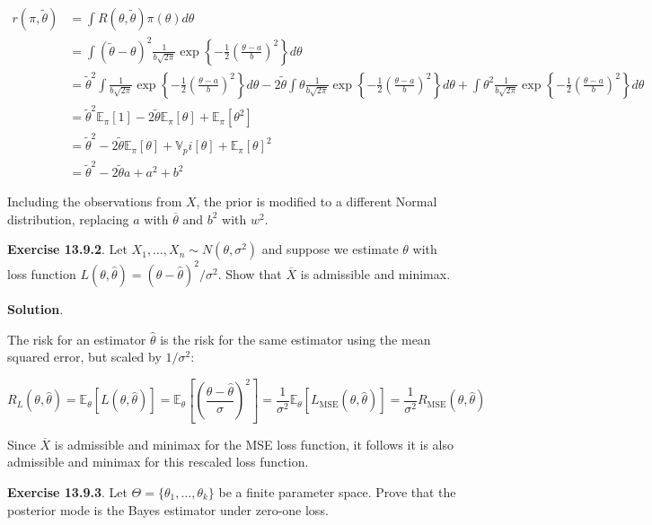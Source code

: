\begin{align}
r(\pi, \tilde{\theta}) &= \int R(\theta, \tilde{\theta}) \pi(\theta) d\theta \\
&= \int (\tilde{\theta} - \theta)^2 \frac{1}{b \sqrt{2 \pi}} \exp \left\{ -\frac{1}{2} \left(\frac{\theta - a}{b}\right)^2 \right\} d\theta \\
&= \tilde{\theta}^2 \int \frac{1}{b \sqrt{2 \pi}} \exp \left\{ -\frac{1}{2} \left(\frac{\theta - a}{b}\right)^2 \right\} d\theta
- 2 \tilde{\theta} \int \theta \frac{1}{b \sqrt{2 \pi}} \exp \left\{ -\frac{1}{2} \left(\frac{\theta - a}{b}\right)^2 \right\} d\theta
+ \int \theta^2 \frac{1}{b \sqrt{2 \pi}} \exp \left\{ -\frac{1}{2} \left(\frac{\theta - a}{b}\right)^2 \right\} d\theta \\
&= \tilde{\theta}^2 \mathbb{E}_\pi[1] - 2 \tilde{\theta} \mathbb{E}_\pi[\theta] + \mathbb{E}_\pi[\theta^2] \\
&= \tilde{\theta}^2 - 2 \tilde{\theta} \mathbb{E}_\pi[\theta] + \mathbb{V}_pi[\theta] + \mathbb{E}_\pi[\theta]^2 \\
&= \tilde{\theta}^2 - 2 \tilde{\theta} a + a^2 + b^2
\end{align}

Including the observations from \(X\), the prior is modified to a
different Normal distribution, replacing \(a\) with
\(\overline{\theta}\) and \(b^2\) with \(w^2\).

\textbf{Exercise 13.9.2}. Let
\(X_1, \dots, X_n \sim N(\theta, \sigma^2)\) and suppose we estimate
\(\theta\) with loss function
\(L(\theta, \hat{\theta}) = (\theta - \hat{\theta})^2 / \sigma^2\). Show
that \(\overline{X}\) is admissible and minimax.

\textbf{Solution}.

The risk for an estimator \(\hat{\theta}\) is the risk for the same
estimator using the mean squared error, but scaled by \(1 / \sigma^2\):

\[
R_L(\theta, \hat{\theta}) = \mathbb{E}_\theta[L(\theta, \hat{\theta})] 
= \mathbb{E}_\theta\left[\left( \frac{\theta - \hat{\theta}}{\sigma} \right)^2 \right] 
= \frac{1}{\sigma^2} \mathbb{E}_\theta[ L_\text{MSE}(\theta, \hat{\theta})]  
= \frac{1}{\sigma^2} R_\text{MSE}(\theta, \hat{\theta})
\]

Since \(\overline{X}\) is admissible and minimax for the MSE loss
function, it follows it is also admissible and minimax for this rescaled
loss function.

\textbf{Exercise 13.9.3}. Let
\(\Theta = \{ \theta_1, \dots, \theta_k \}\) be a finite parameter
space. Prove that the posterior mode is the Bayes estimator under
zero-one loss.

